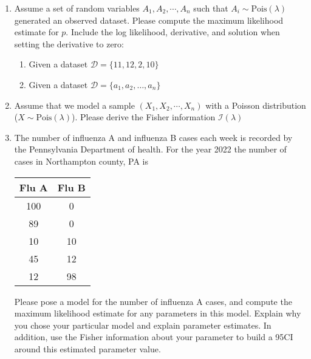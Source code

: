 \begin{enumerate}
    \item Assume a set of random variables $A_{1}, A_{2}, \cdots, A_{n}$ such that $A_{i} \sim \text{Pois}(\lambda)$ generated an observed dataset. Please compute the maximum likelihood estimate for $p$. Include the log likelihood, derivative, and solution when setting the derivative to zero: 
    \begin{enumerate}
        \item Given a dataset $\mathcal{D} = \{ 11,12,2,10 \}$
        \item Given a dataset $\mathcal{D} = \{a_{1}, a_{2}, \dots, a_{n}\}$
    \end{enumerate}

    \item Assume that we model a sample $(X_{1},X_{2},\cdots,X_{n})$ with a Poisson distribution ($X \sim \text{Pois}(\lambda)$). Please derive the Fisher information $\mathcal{I}(\lambda)$ 
        
    \item The number of influenza A and influenza B cases each week is recorded by the Pennsylvania Department of health. 
    For the year 2022 the number of cases in Northampton county, PA is 
    \begin{table}[ht!]
        \centering
        \begin{tabular}{cc}
           Flu A & Flu B  \\
           \hline
            100 & 0 \\ 
            89 & 0 \\ 
            10 & 10 \\ 
            45 & 12 \\ 
            12 & 98 \\ 
        \end{tabular}
    \end{table}
    Please pose a model for the number of influenza A cases, and compute the maximum likelihood estimate for any parameters in this model. 
    Explain why you chose your particular model and explain parameter estimates.
    In addition, use the Fisher information about your parameter to build a 95CI around this estimated parameter value.
    
\end{enumerate}




